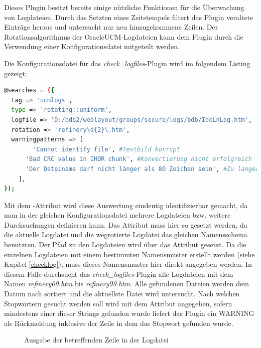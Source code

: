 Dieses Plugin besitzt bereits einige nützliche Funktionen für die Überwachung von Logdateien.
Durch das Setzten eines Zeitstempels filtert das Plugin veraltete Einträge heraus und untersucht nur neu hinzugekommene Zeilen.
Der Rotationsalgorithmus der \gls{OracleUCM}-Logdateien kann dem Plugin durch die Verwendung einer Konfigurationsdatei mitgeteilt werden.

Die Konfigurationsdatei für das \textit{check\_logfiles}-Plugin wird im folgendem Listing gezeigt:


\begin{lstlisting}[captionpos=b, caption=Konfigurationsdatei für \textit{check\_logfiles}, label=chklogcfg, breaklines = true, language=sh]
@searches = ({
  tag => 'ucmlogs',
  type => 'rotating::uniform',
  logfile => 'D:/bdb2/weblayout/groups/secure/logs/bdb/IdcLnLog.htm',
  rotation => 'refinery\d{2}\.htm',
  warningpatterns => [
        'Cannot identify file', #Testbild korrupt
	  'Bad CRC value in IHDR chunk', #Konvertierung nicht erfolgreich
	  'Der Dateiname darf nicht länger als 80 Zeichen sein', #Zu langer Dateiname
    ],
});
\end{lstlisting}

Mit dem -Attribut wird diese Auswertung eindeutig identifizierbar gemacht, da man in der gleichen Konfigurationsdatei mehrere Logdateien bzw. weitere Durchsuchungen definieren kann.
Das Attribut  muss hier so gesetzt werden, da die aktuelle Logdatei und die wegrotierte Logdatei das gleichen Namensschema benutzten.
Der Pfad zu den Logdateien wird über das Attribut  gesetzt.
Da die einzelnen Logdateien mit einem bestimmten Namensmuster erstellt werden (siehe Kapitel \ref{checklog}), muss dieses Namensmuster hier direkt angegeben werden.
In diesem Falle durchsucht das \textit{check\_logfiles}-Plugin alle Logdateien mit dem Namen \textit{refinery00.htm} bis \textit{refinery99.htm}.
Alle gefundenen Dateien werden dem Datum nach sortiert und die aktuellste Datei wird untersucht.
Nach welchen Stopwörtern gesucht werden soll wird mit dem Attribut  angegeben, sofern mindestens einer dieser Strings gefunden wurde liefert das Plugin ein WARNING als Rückmeldung inklusive der Zeile in dem das Stopwort gefunden wurde.

\begin{figure}[ht]
	\centering
		\caption{Ausgabe der betreffenden Zeile in der Logdatei}
		\label{checklogwarn}
\end{figure}






